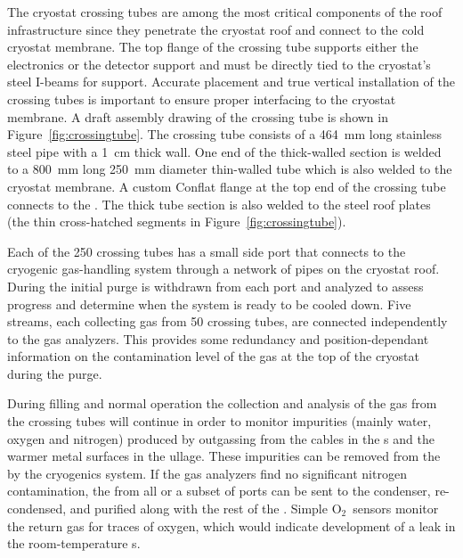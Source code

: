 The cryostat crossing tubes are among the most critical components of the roof infrastructure since they penetrate the cryostat roof and connect to the cold cryostat membrane. The top flange of the crossing tube supports either the electronics \fdth or the detector support \fdth and must be directly tied to the cryostat's steel I-beams for support. 
Accurate placement and true vertical installation of the crossing tubes is important to ensure proper interfacing to the cryostat membrane. 
A draft assembly drawing of the crossing tube is shown in Figure~\ref{fig:crossingtube}. 
The crossing tube consists of a \SI{464}{mm} long stainless steel pipe with a \SI{1}{cm} thick wall. 
One end of the thick-walled section is welded to a \SI{800}{mm} long \SI{250}{mm} diameter thin-walled tube which is also welded to the cryostat membrane.
A custom Conflat flange at the top end of the crossing tube connects to the \fdth. 
The thick tube section is also welded to the steel roof plates (the thin cross-hatched segments in Figure~\ref{fig:crossingtube}).  

 
Each of the 250 crossing tubes has a small side port that connects to the cryogenic gas-handling system through a network of pipes on the cryostat roof. During the initial purge  is withdrawn from each port and analyzed to assess progress and determine when the system is ready to be cooled down. Five  streams, each collecting gas from 50 crossing tubes, are connected independently to the gas analyzers. This provides some redundancy and position-dependant information on the contamination level of the gas at the top of the cryostat during the purge.
 
During filling and normal operation the collection and analysis of the gas from the crossing tubes will continue in order to monitor impurities (mainly water, oxygen and nitrogen) produced by outgassing from the cables in the \fdth{}s and the warmer metal surfaces in the ullage. These impurities can be removed from the  by the cryogenics system.
If the gas analyzers find no significant nitrogen contamination, the  from all or a subset of ports can be sent to the condenser, re-condensed, and purified along with the rest of the . Simple O$_2$\ sensors monitor the return gas for traces of oxygen, which would indicate development of a leak in the room-temperature \fdth{}s.

